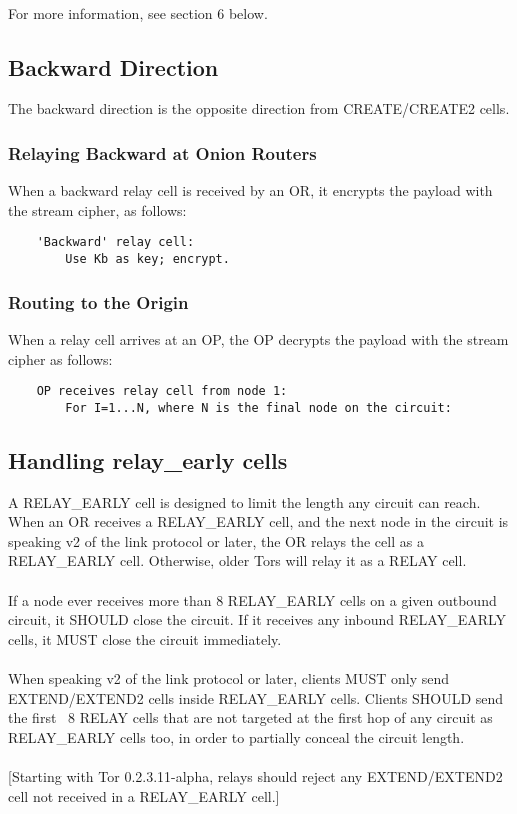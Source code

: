 \paragraph{}
For more information, see section 6 below.

\subsection{Backward Direction}
The backward direction is the opposite direction from
CREATE/CREATE2 cells.

\subsubsection{Relaying Backward at Onion Routers}
When a backward relay cell is received by an OR, it encrypts the payload
with the stream cipher, as follows:
\begin{verbatim}
    'Backward' relay cell:
        Use Kb as key; encrypt.
\end{verbatim}

\subsubsection{Routing to the Origin}
When a relay cell arrives at an OP, the OP decrypts the payload
with the stream cipher as follows:
\begin{verbatim}
    OP receives relay cell from node 1:
        For I=1...N, where N is the final node on the circuit:
\end{verbatim}

\subsection{Handling relay\_early cells}
A RELAY\_EARLY cell is designed to limit the length any circuit can reach.
When an OR receives a RELAY\_EARLY cell, and the next node in the circuit
is speaking v2 of the link protocol or later, the OR relays the cell as a
RELAY\_EARLY cell. Otherwise, older Tors will relay it as a RELAY cell.

\paragraph{}
If a node ever receives more than 8 RELAY\_EARLY cells on a given
outbound circuit, it SHOULD close the circuit. If it receives any
inbound RELAY\_EARLY cells, it MUST close the circuit immediately.

\paragraph{}
When speaking v2 of the link protocol or later, clients MUST only send
EXTEND/EXTEND2 cells inside RELAY\_EARLY cells. Clients SHOULD send the first ~8
RELAY cells that are not targeted at the first hop of any circuit as
RELAY\_EARLY cells too, in order to partially conceal the circuit length.

\paragraph{}
[Starting with Tor 0.2.3.11-alpha, relays should reject any
EXTEND/EXTEND2 cell not received in a RELAY\_EARLY cell.]